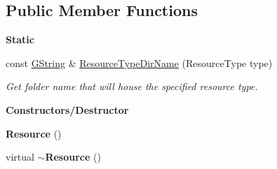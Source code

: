 \subsection*{Public Member Functions}
\begin{Indent}\textbf{ Static}\par
\begin{DoxyCompactItemize}
\item 
\mbox{\label{classrev_1_1_resource_a721cacb4fd2c9093218d72dc9c291fd5}} 
const \mbox{\hyperlink{classrev_1_1_g_string}{G\+String}} \& \mbox{\hyperlink{classrev_1_1_resource_a721cacb4fd2c9093218d72dc9c291fd5}{Resource\+Type\+Dir\+Name}} (Resource\+Type type)
\begin{DoxyCompactList}\small\item\em Get folder name that will house the specified resource type. \end{DoxyCompactList}\end{DoxyCompactItemize}
\end{Indent}
\begin{Indent}\textbf{ Constructors/\+Destructor}\par
\begin{DoxyCompactItemize}
\item 
\mbox{\label{classrev_1_1_resource_a692070ef1e352379f443854fd3a25615}} 
{\bfseries Resource} ()
\item 
\mbox{\label{classrev_1_1_resource_a7a3eaf66bb28c498a32b2689f6527ca5}} 
virtual {\bfseries $\sim$\+Resource} ()
\end{DoxyCompactItemize}
\end{Indent}
